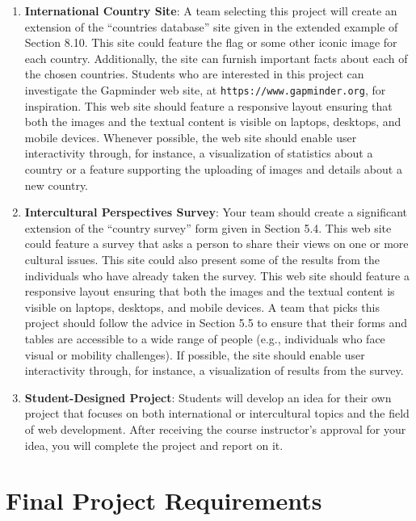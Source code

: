 \documentclass[11pt]{article}
\newcommand{\url}[1]{\lstinline{#1}}
\begin{document}
\begin{enumerate}
  \item {\bf International Country Site}: A team selecting this project will
    create an extension of the ``countries database'' site given in the extended
    example of Section 8.10. This site could feature the flag or some other
    iconic image for each country. Additionally, the site can furnish important
    facts about each of the chosen countries. Students who are interested in
    this project can investigate the Gapminder web site, at
    \url{https://www.gapminder.org}, for inspiration. This web site should
    feature a responsive layout ensuring that both the images and the textual
    content is visible on laptops, desktops, and mobile devices. Whenever
    possible, the web site should enable user interactivity through, for
    instance, a visualization of statistics about a country or a feature
    supporting the uploading of images and details about a new country.

  \item {\bf Intercultural Perspectives Survey}: Your team should create a
    significant extension of the ``country survey'' form given in Section 5.4.
    This web site could feature a survey that asks a person to share their views
    on one or more cultural issues. This site could also present some of the
    results from the individuals who have already taken the survey. This web
    site should feature a responsive layout ensuring that both the images and
    the textual content is visible on laptops, desktops, and mobile devices. A
    team that picks this project should follow the advice in Section 5.5 to
    ensure that their forms and tables are accessible to a wide range of people
    (e.g., individuals who face visual or mobility challenges). If possible, the
    site should enable user interactivity through, for instance, a visualization
    of results from the survey.

  \item {\bf Student-Designed Project}: Students will develop an idea for their
    own project that focuses on both international or intercultural topics and
    the field of web development. After receiving the course instructor's
    approval for your idea, you will complete the project and report on it.

\end{enumerate}

\section*{Final Project Requirements}
\end{document}

